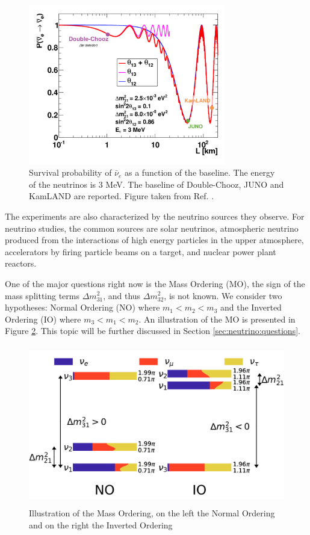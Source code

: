\begin{figure}[ht]
  \centering
  \includegraphics[height=7cm]{images/neutrinos/baseline_effect.png}
  \caption{Survival probability of $\bar{\nu}_e$ as a function of the baseline. The energy of the neutrinos is 3 MeV. The baseline of Double-Chooz, JUNO and KamLAND are reported. Figure taken from Ref. \cite{lebrin_towards_2022}.}
  \label{fig:neutrino:baseline_effect}
\end{figure}

The experiments are also characterized by the neutrino sources they observe. For neutrino studies, the common sources are solar neutrinos, atmospheric neutrino produced from the interactions of high energy particles in the upper atmosphere, accelerators by firing particle beams on a target, and nuclear power plant reactors.

One of the major questions right now is the Mass Ordering (MO), the sign of the mass splitting terms $\Delta m^2_{31}$, and thus $\Delta m^2_{32}$, is not known. We consider two hypotheses: Normal Ordering (NO) where $m_1 < m_2 < m_3$ and the Inverted Ordering (IO) where $m_3 < m_1 < m_2$. An illustration of the MO is presented in Figure \ref{fig:neutrino:nmo}. This topic will be further discussed in Section \ref{sec:neutrino:questions}.

\begin{figure}
  \centering
  \includegraphics[height=7cm]{images/neutrinos/nmo.png}
  \caption{Illustration of the Mass Ordering, on the left the Normal Ordering and on the right the Inverted Ordering}
  \label{fig:neutrino:nmo}
\end{figure}

